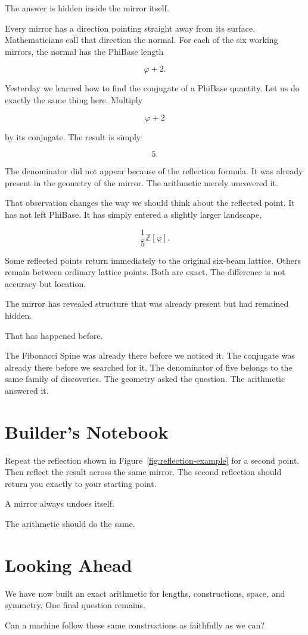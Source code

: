 The answer is hidden inside the mirror itself.

Every mirror has a direction pointing straight away from its surface. Mathematicians call that direction the normal. For each of the six working mirrors, the normal has the PhiBase length

\[
\varphi+2.
\]

Yesterday we learned how to find the conjugate of a PhiBase quantity. Let us do exactly the same thing here. Multiply

\[
\varphi+2
\]

by its conjugate. The result is simply

\[
5.
\]

The denominator did not appear because of the reflection formula. It was already present in the geometry of the mirror. The arithmetic merely uncovered it.

That observation changes the way we should think about the reflected point. It has not left PhiBase. It has simply entered a slightly larger landscape,

\[
\frac{1}{5}\mathbb{Z}[\varphi].
\]

Some reflected points return immediately to the original six-beam lattice. Others remain between ordinary lattice points. Both are exact. The difference is not accuracy but location.

The mirror has revealed structure that was already present but had remained hidden.

That has happened before.

The Fibonacci Spine was already there before we noticed it. The conjugate was already there before we searched for it. The denominator of five belongs to the same family of discoveries. The geometry asked the question. The arithmetic answered it.

\section*{Builder's Notebook}

Repeat the reflection shown in Figure~\ref{fig:reflection-example} for a second point. Then reflect the result across the same mirror. The second reflection should return you exactly to your starting point.

A mirror always undoes itself.

The arithmetic should do the same.

\section*{Looking Ahead}

We have now built an exact arithmetic for lengths, constructions, space, and symmetry. One final question remains.

Can a machine follow these same constructions as faithfully as we can?
